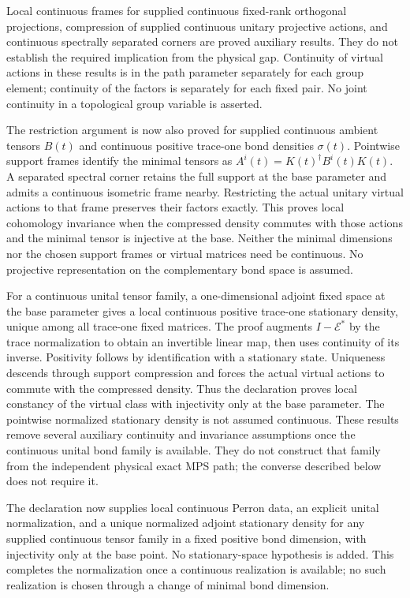 \documentclass{article}
\begin{document}
Local continuous frames
for supplied continuous fixed-rank orthogonal projections, compression of
supplied continuous unitary projective actions, and continuous spectrally
separated corners are proved auxiliary results. They do not establish the
required implication from the physical gap. Continuity of virtual actions
in these results is in the path parameter separately for each group element;
continuity of the factors is separately for each fixed pair. No joint
continuity in a topological group variable is asserted.

The restriction argument is now also proved for supplied continuous
ambient tensors $B(t)$ and continuous positive trace-one bond densities
$\sigma(t)$. Pointwise support frames identify the minimal tensors as
$A^i(t)=K(t)^\dagger B^i(t)K(t)$. A separated spectral corner retains
the full support at the base parameter and admits a continuous isometric
frame nearby. Restricting the actual unitary virtual actions to that
frame preserves their factors exactly. This proves local cohomology
invariance when the compressed density commutes with those actions and
the minimal tensor is injective at the base. Neither the minimal
dimensions nor the chosen support frames or virtual matrices need be
continuous. No projective representation on the complementary bond space
is assumed.

For a continuous unital tensor family, a one-dimensional adjoint fixed
space at the base parameter gives a local continuous positive trace-one
stationary density, unique among all trace-one fixed matrices. The proof
augments $I-\mathcal E^*$ by the trace normalization to obtain an
invertible linear map, then uses continuity of its inverse. Positivity
follows by identification with a stationary state. Uniqueness descends
through support compression and forces the actual virtual actions to
commute with the compressed density. Thus the declaration
proves local constancy of the virtual class with injectivity only at the
base parameter. The pointwise normalized stationary density is not
assumed continuous. These results remove several auxiliary continuity
and invariance assumptions once the continuous unital bond family is
available. They do not construct that
family from the independent physical exact MPS path; the converse described
below does not require it.

The declaration
now supplies local continuous Perron data, an explicit unital normalization,
and a unique normalized adjoint stationary density for any supplied continuous
tensor family in a fixed positive bond dimension, with injectivity only at the
base point. No stationary-space hypothesis is added. This completes the
normalization once a continuous realization is available; no such
realization is chosen through a change of minimal bond dimension.
\end{document}
